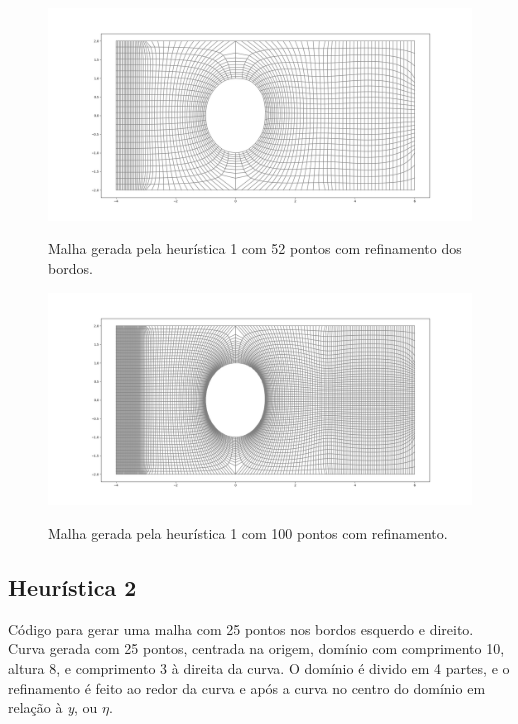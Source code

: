 \documentclass[a4paper]{article}
\begin{document}
\begin{figure}[H]
	\centering
	\includegraphics[width=1.0\textwidth]{heuristica_1_52pts_refined.png}
	\label{fig:heuristic1_50pts_refined} 
	\caption[caption]{Malha gerada pela heurística 1 com 52 pontos com refinamento dos bordos.}
\end{figure}

\begin{figure}[H]
	\centering
	\includegraphics[width=1.0\textwidth]{heuristica_1_100pts_refined.png}
	\label{fig:heuristic1_100pts_refined} 
	\caption[caption]{Malha gerada pela heurística 1 com 100 pontos com refinamento.}
\end{figure}






\subsection{Heurística 2}



Código para gerar uma malha com 25 pontos nos bordos esquerdo e direito. Curva gerada com 25 pontos, centrada na origem, domínio com comprimento 10, altura 8, e comprimento 3 à direita da curva. O domínio é divido em 4 partes, e o refinamento é feito ao redor da curva e após a curva no centro do domínio em relação à \textit{y}, ou $\eta$.
\end{document}
